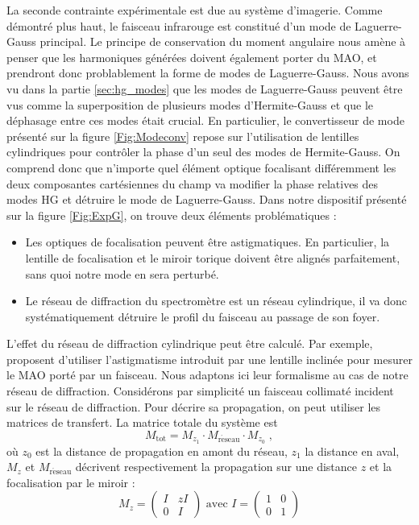 La seconde contrainte expérimentale est due au système d'imagerie. Comme démontré plus haut, le faisceau infrarouge est constitué d'un mode de Laguerre-Gauss principal. Le principe de conservation du moment angulaire nous amène à penser que les harmoniques générées doivent également porter du MAO, et prendront donc problablement la forme de modes de Laguerre-Gauss. Nous avons vu dans la partie \ref{sec:hg_modes} que les modes de Laguerre-Gauss peuvent être vus comme la superposition de plusieurs modes d'Hermite-Gauss et que le déphasage entre ces modes était crucial. En particulier, le convertisseur de mode présenté sur la figure \ref{Fig:Modeconv} repose sur l'utilisation de lentilles cylindriques pour contrôler la phase d'un seul des modes de Hermite-Gauss. On comprend donc que n'importe quel élément optique focalisant différemment les deux composantes cartésiennes du champ va modifier la phase relatives des modes HG et détruire le mode de Laguerre-Gauss. Dans notre dispositif présenté sur la figure \ref{Fig:ExpG}, on trouve deux éléments problématiques :

\begin{itemize}
\item Les optiques de focalisation peuvent être astigmatiques. En particulier, la lentille de focalisation et le miroir torique doivent être alignés parfaitement, sans quoi notre mode en sera perturbé.\\
\item Le réseau de diffraction du spectromètre est un réseau cylindrique, il va donc systématiquement détruire le profil du faisceau au passage de son foyer.\\
\end{itemize}

L'effet du réseau de diffraction cylindrique peut être calculé. Par exemple,  proposent d'utiliser l'astigmatisme introduit par une lentille inclinée pour mesurer le MAO porté par un faisceau. Nous adaptons ici leur formalisme au cas de notre réseau de diffraction. Considérons par simplicité un faisceau collimaté incident sur le réseau de diffraction. Pour décrire sa propagation, on peut utiliser les matrices de transfert. La matrice totale du système est
\begin{equation*}
M_{\mathrm{tot}} = M_{z_1}\cdot M_{\mathrm{r\acute{e}seau}}\cdot M_{z_0}\;,
\end{equation*}
où $z_0$ est la distance de propagation en amont du réseau, $z_1$ la distance en aval, $M_z$ et $M_{\mathrm{r\acute{e}seau}}$ décrivent respectivement la propagation sur une distance $z$ et la focalisation par le miroir :
\begin{equation*}
M_z = \left(
\begin{array}{cc}
	I & zI \\
	0 & I
\end{array} \right)\text{ avec } 
I = \left(
\begin{array}{cc}
	1 & 0 \\
	0 & 1
\end{array} \right)
\end{equation*}


